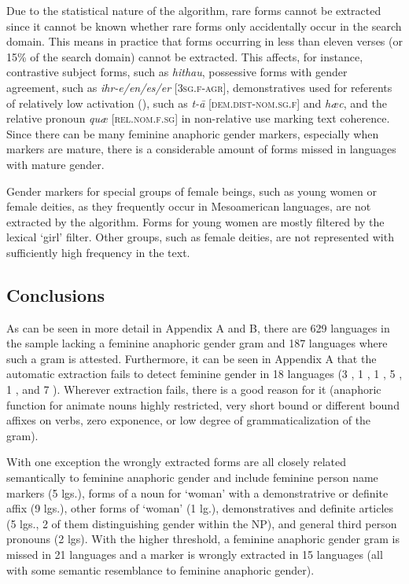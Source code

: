 \documentclass[output=collectionpaper]{langsci/langscibook}
\begin{document}
Due to the statistical nature of the algorithm, rare forms cannot be extracted since it cannot be known whether rare forms only accidentally occur in the search domain. This means in practice that forms occurring in less than eleven verses (or 15\% of the search domain) cannot be extracted. This affects, for instance, contrastive subject forms, such as  \textit{hithau}, possessive forms with gender agreement, such as  \textit{ihr-e/en/es/er} [\textsc{3sg.f-agr}], demonstratives used for referents of relatively low activation (\citealt[327]{Kibrik2011}), such as  \textit{t-ā} [\textsc{dem.dist-nom.sg.f}] and  \textit{hæc}, and the  relative pronoun \textit{quæ} [\textsc{rel.nom.f.sg}] in non-relative use marking text coherence. Since there can be many feminine anaphoric gender markers, especially when markers are mature, there is a considerable amount of forms missed in languages with mature gender.

Gender markers for special groups of female beings, such as young women or female deities, as they frequently occur in Mesoamerican languages, are not extracted by the algorithm. Forms for young women are mostly filtered by the lexical ‘girl’ filter. Other groups, such as female deities, are not represented with sufficiently high frequency in the text.

\subsection{Conclusions}
\label{sec:BW:3.7}

As can be seen in more detail in Appendix A and B, there are 629 languages in the sample lacking a feminine anaphoric gender gram and 187 languages where such a gram is attested. Furthermore, it can be seen in Appendix A that the automatic extraction fails to detect feminine gender in 18 languages (3 , 1 , 1 , 5 , 1 , and 7 ). Wherever extraction fails, there is a good reason for it (anaphoric function for animate nouns highly restricted, very short bound or different bound affixes on verbs, zero exponence, or low degree of grammaticalization of the gram).

With one exception the wrongly extracted forms are all closely related semantically to feminine anaphoric gender and include feminine person name markers (5 lgs.), forms of a noun for ‘woman’ with a demonstratrive or definite affix (9 lgs.), other forms of ‘woman’ (1 lg.), demonstratives and definite articles (5 lgs., 2 of them distinguishing gender within the NP), and general third person pronouns (2 lgs). With the higher threshold, a feminine anaphoric gender gram is missed in 21 languages and a marker is wrongly extracted in 15 languages (all with some semantic resemblance to feminine anaphoric gender).
\end{document}
